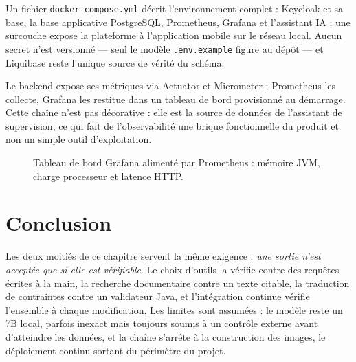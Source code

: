 Un fichier \texttt{docker-compose.yml} décrit l'environnement complet :
Keycloak et sa base, la base applicative PostgreSQL, Prometheus, Grafana et
l'assistant IA ; une surcouche expose la plateforme à l'application mobile sur
le réseau local. Aucun secret n'est versionné — seul le modèle
\texttt{.env.example} figure au dépôt — et Liquibase reste l'unique source de
vérité du schéma.

Le backend expose ses métriques via Actuator et Micrometer ; Prometheus les
collecte, Grafana les restitue dans un tableau de bord provisionné au
démarrage. Cette chaîne n'est pas décorative : elle est la source de données de
l'assistant de supervision, ce qui fait de l'observabilité une brique
fonctionnelle du produit et non un simple outil d'exploitation.

\begin{figure}[htbp]
  \centering
  \caption{Tableau de bord Grafana alimenté par Prometheus : mémoire JVM,
  charge processeur et latence HTTP.}
  \label{fig:ch4-monitoring}
\end{figure}

\section{Conclusion}

Les deux moitiés de ce chapitre servent la même exigence : \emph{une sortie
n'est acceptée que si elle est vérifiable}. Le choix d'outils la vérifie contre
des requêtes écrites à la main, la recherche documentaire contre un texte
citable, la traduction de contraintes contre un validateur Java, et
l'intégration continue vérifie l'ensemble à chaque modification. Les limites
sont assumées : le modèle reste un 7B local, parfois inexact mais toujours
soumis à un contrôle externe avant d'atteindre les données, et la chaîne
s'arrête à la construction des images, le déploiement continu sortant du
périmètre du projet.
